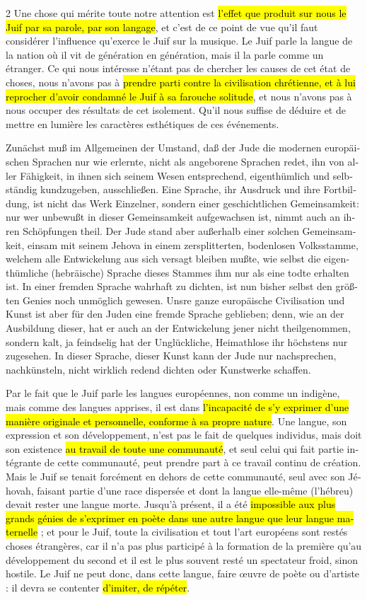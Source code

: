 \documentclass[a4paper,12pt]{article}
\newcommand\chunks[2]{%
\begin{leftcolumn*}\begin{otherlanguage}{german}%
{#1}%
\end{otherlanguage}\end{leftcolumn*}%
\begin{rightcolumn}\begin{otherlanguage}{french}%
{#2}%
\end{otherlanguage}\end{rightcolumn}%
}
\begin{document}
\begin{paracol}{2}
         {Une chose qui mérite toute notre attention est \hl{l’effet que produit sur nous le Juif par sa parole, par son langage}, et c’est de ce point de vue qu’il faut considérer l’influence qu’exerce le Juif sur la musique. Le Juif parle la langue de la nation où il vit de génération en génération, mais il la parle comme un étranger. Ce qui nous intéresse n’étant pas de chercher les causes de cet état de choses, nous n’avons pas à \hl{prendre parti contre la civilisation chrétienne, et à lui reprocher d’avoir condamné le Juif à sa farouche solitude}, et nous n’avons pas à nous occuper des résultats de cet isolement. Qu’il nous suffise de déduire et de mettre en lumière les caractères esthétiques de ces événements.}
  \chunks{Zunächst muß im Allgemeinen der Umstand, daß der Jude die modernen europäischen Sprachen nur wie erlernte, nicht als angeborene Sprachen redet, ihn von aller Fähigkeit, in ihnen sich seinem Wesen entsprechend, eigenthümlich und selbständig kundzugeben, ausschließen. Eine Sprache, ihr Ausdruck und ihre Fortbildung, ist nicht das Werk Einzelner, sondern einer geschichtlichen Gemeinsamkeit: nur wer unbewußt in dieser Gemeinsamkeit aufgewachsen ist, nimmt auch an ihren Schöpfungen theil. Der Jude stand aber außerhalb einer solchen Gemeinsamkeit, einsam mit seinem Jehova in einem zersplitterten, bodenlosen Volksstamme, welchem alle Entwickelung aus sich versagt bleiben mußte, wie selbst die eigenthümliche (hebräische) Sprache dieses Stammes ihm nur als eine todte erhalten ist. In einer fremden Sprache wahrhaft zu dichten, ist nun bisher selbst den größten Genies noch unmöglich gewesen. Unsre ganze europäische Civilisation und Kunst ist aber für den Juden eine fremde Sprache geblieben; denn, wie an der Ausbildung dieser, hat er auch an der Entwickelung jener nicht theilgenommen, sondern kalt, ja feindselig hat der Unglückliche, Heimathlose ihr höchstens nur zugesehen. In dieser Sprache, dieser Kunst kann der Jude nur nachsprechen, nachkünsteln, nicht wirklich redend dichten oder Kunstwerke schaffen.}
         {Par le fait que le Juif parle les langues européennes, non comme un indigène, mais comme des langues apprises, il est dans \hl{l’incapacité de s’y exprimer d’une manière originale et personnelle, conforme à sa propre nature}. Une langue, son expression et son développement, n’est pas le fait de quelques individus, mais doit son existence \hl{au travail de toute une communauté}, et seul celui qui fait partie intégrante de cette communauté, peut prendre part à ce travail continu de création. Mais le Juif se tenait forcément en dehors de cette communauté, seul avec son Jéhovah, faisant partie d’une race dispersée et dont la langue elle-même (l’hébreu) devait rester une langue morte. Jusqu’à présent, il a été \hl{impossible aux plus grands génies de s’exprimer en poète dans une autre langue que leur langue maternelle} ; et pour le Juif, toute la civilisation et tout l’art européens sont restés choses étrangères, car il n’a pas plus participé à la formation de la première qu’au développement du second et il est le plus souvent resté un spectateur froid, sinon hostile. Le Juif ne peut donc, dans cette langue, faire œuvre de poète ou d’artiste : il devra se contenter \hl{d’imiter, de répéter}.}

\end{paracol}
\end{document}
